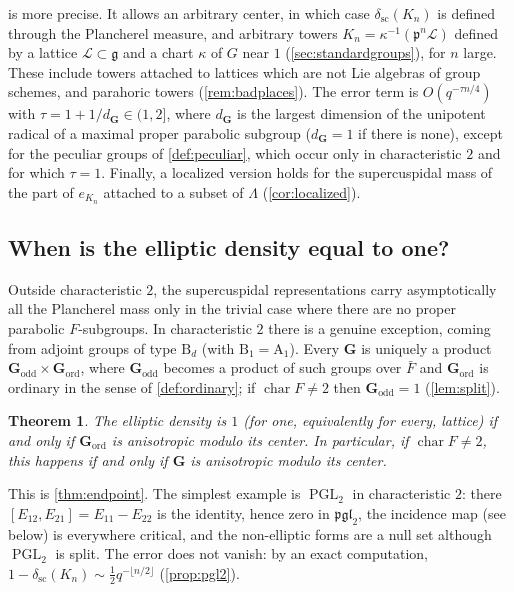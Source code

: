 \documentclass[11pt,reqno]{amsart}
\numberwithin{equation}{section}
\theoremstyle{plain}
\theoremstyle{definition}
\theoremstyle{remark}
\theoremstyle{plain}
\newtheorem{introtheorem}{Theorem}
\newcommand{\pp}{\mathfrak{p}}   %
\newcommand{\Lat}{\mathcal{L}}   %
\newcommand{\dLat}{\Lambda}      %
\newcommand{\bG}{\mathbf{G}}     %
\newcommand{\Godd}{\bG_{\mathrm{odd}}}
\newcommand{\Gord}{\bG_{\mathrm{ord}}}
\newcommand{\g}{\mathfrak{g}}    %
\newcommand{\gd}{\mathfrak{g}^*} %
\newcommand{\scd}[1]{\delta_{\mathrm{sc}}(#1)}
\DeclareMathOperator{\PGL}{PGL}
\DeclareMathOperator{\chr}{char}   %
\newcommand{\peculiar}{peculiar}
\newcommand{\ordinary}{ordinary}
\newcommand{\eexp}{\tau}
\newcommand{\dG}{d_{\bG}}
\begin{document}
 is more precise. It allows an arbitrary center, in which
case $\scd{K_n}$ is defined through the Plancherel measure, and arbitrary
towers $K_n=\kappa^{-1}(\pp^n\Lat)$ defined by a lattice $\Lat\subset\g$
and a chart $\kappa$ of $G$ near $1$ (\cref{sec:standardgroups}), for $n$
large. These include towers attached to lattices which are not Lie
algebras of group schemes, and parahoric towers (\cref{rem:badplaces}). The
error term is $O(q^{-\eexp n/4})$ with $\eexp=1+1/\dG{}\in(1,2]$, where
$\dG{}$ is the largest dimension of the unipotent radical of a maximal
proper parabolic subgroup ($\dG{}=1$ if there is none), except for the \peculiar{} groups of
\cref{def:peculiar}, which occur only in characteristic $2$ and for which
$\eexp=1$. Finally, a localized version holds for the supercuspidal mass
of the part of $e_{K_n}$ attached to a subset of $\dLat$
(\cref{cor:localized}).

\subsection{When is the elliptic density equal to one?}

Outside characteristic $2$, the supercuspidal representations carry
asymptotically all the Plancherel mass only in the trivial case where there are
no proper parabolic $F$-subgroups. In
characteristic $2$ there is a genuine exception, coming from adjoint groups
of type $\mathrm B_d$ (with $\mathrm B_1=\mathrm A_1$). Every $\bG$ is
uniquely a product $\Godd\times\Gord$, where $\Godd$ becomes a product of
such groups over $\bar F$ and $\Gord$ is \ordinary{} in the sense of
\cref{def:ordinary}; if $\chr F\ne2$ then $\Godd=1$ (\cref{lem:split}).

\begin{introtheorem}\label{thm:B}
The elliptic density is $1$ (for one, equivalently for every, lattice) if
and only if $\Gord$ is anisotropic modulo its center. In particular, if
$\chr F\ne2$, this happens if and only if $\bG$ is anisotropic modulo its
center.
\end{introtheorem}

This is \cref{thm:endpoint}. The simplest example is $\PGL_2$ in
characteristic $2$: there $[E_{12},E_{21}]=E_{11}-E_{22}$ is the identity,
hence zero in $\mathfrak{pgl}_2$, the incidence map (see below) is
everywhere critical, and the non-elliptic forms are a null set although
$\PGL_2$ is split. The error does not vanish: by an exact computation,
$1-\scd{K_n}\sim\frac12q^{-\lfloor n/2\rfloor}$ (\cref{prop:pgl2}).
\end{document}
